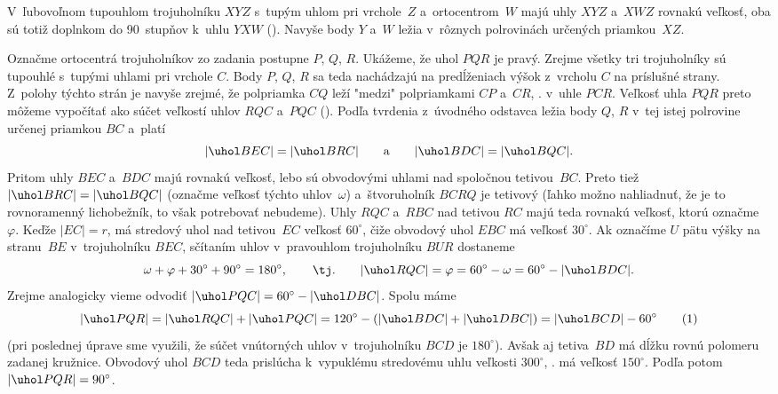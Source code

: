 {%
V~ľubovoľnom tupouhlom trojuholníku $XYZ$ s~tupým uhlom pri vrchole~$Z$ a~ortocentrom~$W$ majú uhly $XYZ$ a~$XWZ$ rovnakú veľkosť, oba sú totiž doplnkom do 90~stupňov k~uhlu $YXW$ (\obr). Navyše body $Y$ a~$W$ ležia v~rôznych polrovinách určených priamkou~$XZ$.

Označme ortocentrá trojuholníkov zo zadania postupne $P$, $Q$, $R$. Ukážeme, že uhol $PQR$ je pravý. Zrejme všetky tri trojuholníky sú tupouhlé s~tupými uhlami pri vrchole $C$. Body $P$, $Q$, $R$ sa teda nachádzajú na predĺženiach výšok z~vrcholu $C$ na príslušné strany. Z~polohy týchto strán je navyše zrejmé, že polpriamka $CQ$ leží "medzi" polpriamkami $CP$ a~$CR$, \tj. v~uhle $PCR$. Veľkosť uhla $PQR$ preto môžeme vypočítať ako súčet veľkostí uhlov $RQC$ a~$PQC$ (\obr). 
%
Podľa tvrdenia z~úvodného odstavca ležia body $Q$, $R$ v~tej istej polrovine určenej priamkou $BC$ a~platí
$$
  |\uhol BEC|=|\uhol BRC| \qquad\text{a}\qquad |\uhol BDC|=|\uhol BQC|.
$$
Pritom uhly $BEC$ a~$BDC$ majú rovnakú veľkosť, lebo sú obvodovými uhlami nad spoločnou tetivou~$BC$. Preto tiež $|\uhol BRC|=|\uhol BQC|$ (označme veľkosť týchto uhlov~$\omega$) a~štvoruholník $BCRQ$ je tetivový (ľahko možno nahliadnuť, že je to rovnoramenný lichobežník, to však potrebovať nebudeme). Uhly $RQC$ a~$RBC$ nad tetivou $RC$ majú teda rovnakú veľkosť, ktorú označme~$\varphi$. Keďže $|EC|=r$, má stredový uhol nad tetivou~$EC$ veľkosť $60^\circ$, čiže obvodový uhol $EBC$ má veľkosť $30^\circ$. Ak označíme $U$ pätu výšky na stranu~$BE$ v~trojuholníku $BEC$, sčítaním uhlov v~pravouhlom trojuholníku $BU\!R$ dostaneme
$$
  \omega+\varphi+30^\circ+90^\circ=180^\circ,\qquad\text{\tj.}\qquad
  |\uhol RQC|=\varphi=60^\circ-\omega=60^\circ-|\uhol BDC|.
$$
Zrejme analogicky vieme odvodiť $|\uhol PQC|=60^\circ-|\uhol DBC|$. Spolu máme
$$
  |\uhol PQR|=|\uhol RQC|+|\uhol PQC|=120^\circ-(|\uhol BDC|+|\uhol DBC|)=|\uhol BCD|-60^\circ
\tag1
$$
(pri poslednej úprave sme využili, že súčet vnútorných uhlov v~trojuholníku $BCD$ je $180^\circ$). Avšak aj tetiva~$BD$ má dĺžku rovnú polomeru zadanej kružnice. Obvodový uhol $BCD$ teda prislúcha k~vypuklému stredovému uhlu veľkosti $300^\circ$, \tj. má veľkosť $150^\circ$. Podľa  potom $|\uhol PQR|=90^\circ$.}

